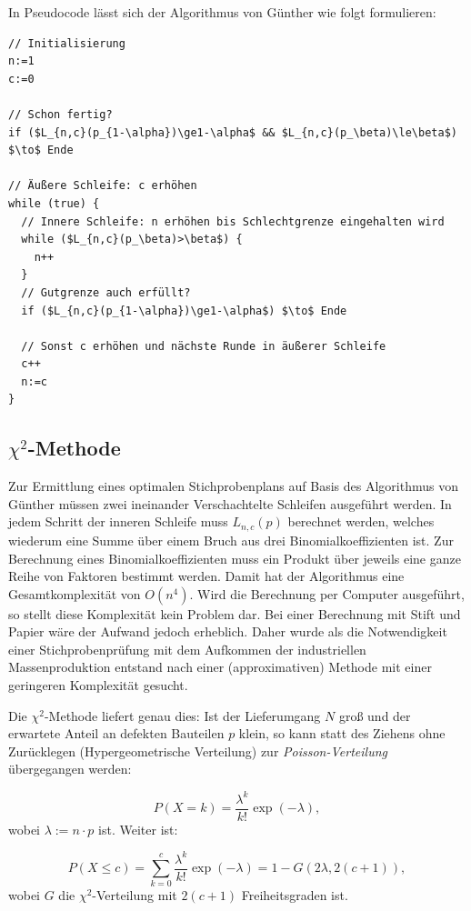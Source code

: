 \documentclass[a4paper,11pt,oneside]{article}
\begin{document}
In Pseudocode lässt sich der Algorithmus von Günther wie folgt formulieren:

\begin{lstlisting}[inputencoding={utf8},frame=single]
// Initialisierung
n:=1
c:=0

// Schon fertig?
if ($L_{n,c}(p_{1-\alpha})\ge1-\alpha$ && $L_{n,c}(p_\beta)\le\beta$) $\to$ Ende

// Äußere Schleife: c erhöhen
while (true) {
  // Innere Schleife: n erhöhen bis Schlechtgrenze eingehalten wird
  while ($L_{n,c}(p_\beta)>\beta$) {
    n++
  }
  // Gutgrenze auch erfüllt?
  if ($L_{n,c}(p_{1-\alpha})\ge1-\alpha$) $\to$ Ende

  // Sonst c erhöhen und nächste Runde in äußerer Schleife
  c++
  n:=c
}
\end{lstlisting}

\subsection[Chi-Quadrat-Methode]{$\chi^2$-Methode}

Zur Ermittlung eines optimalen Stichprobenplans auf Basis des Algorithmus von Günther müssen zwei ineinander Verschachtelte Schleifen ausgeführt werden. In jedem Schritt der inneren Schleife muss $L_{n,c}(p)$ berechnet werden, welches wiederum eine Summe über einem Bruch aus drei Binomialkoeffizienten ist. Zur Berechnung eines Binomialkoeffizienten muss ein Produkt über jeweils eine ganze Reihe von Faktoren bestimmt werden. Damit hat der Algorithmus eine Gesamtkomplexität von $O(n^4)$. Wird die Berechnung per Computer ausgeführt, so stellt diese Komplexität kein Problem dar. Bei einer Berechnung mit Stift und Papier wäre der Aufwand jedoch erheblich. Daher wurde als die Notwendigkeit einer Stichprobenprüfung mit dem Aufkommen der industriellen Massenproduktion entstand nach einer (approximativen) Methode mit einer geringeren Komplexität gesucht.

Die $\chi^2$-Methode liefert genau dies: Ist der Lieferumgang $N$ groß und der erwartete Anteil an defekten Bauteilen $p$ klein, so kann statt des Ziehens ohne Zurücklegen (Hypergeometrische Verteilung) zur \emph{Poisson-Verteilung} übergegangen werden:

$$
P(X=k)=\frac{\lambda^k}{k!}\exp(-\lambda),
$$
wobei $\lambda:=n\cdot p$ ist. Weiter ist:

\begin{equation}\label{eq:LPoisson}
P(X\le c)=
\sum_{k=0}^c \frac{\lambda^k}{k!}\exp(-\lambda)=
1-G(2\lambda,2(c+1)),
\end{equation}
wobei $G$ die $\chi^2$-Verteilung mit $2(c+1)$ Freiheitsgraden ist.
\end{document}
